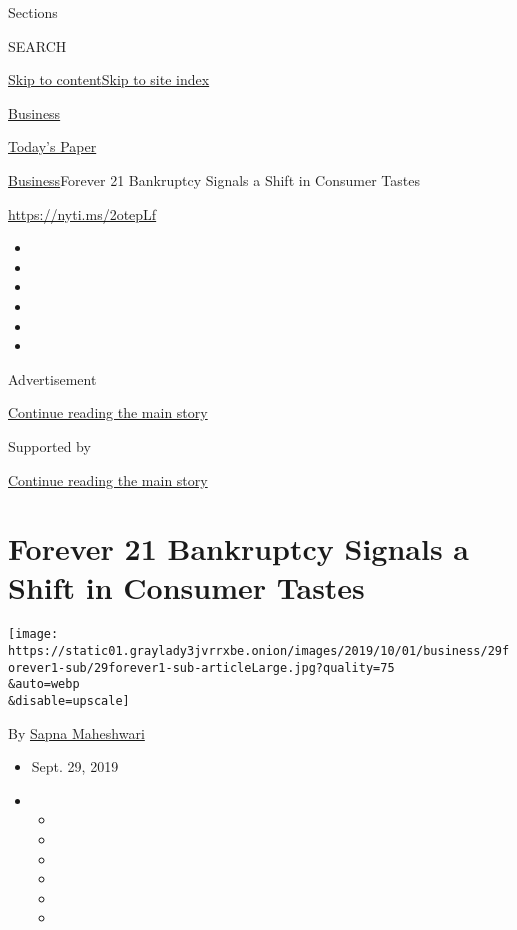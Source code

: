 Sections

SEARCH

\protect\hyperlink{site-content}{Skip to
content}\protect\hyperlink{site-index}{Skip to site index}

\href{https://www.nytimes3xbfgragh.onion/section/business}{Business}

\href{https://myaccount.nytimes3xbfgragh.onion/auth/login?response_type=cookie\&client_id=vi}{}

\href{https://www.nytimes3xbfgragh.onion/section/todayspaper}{Today's
Paper}

\href{/section/business}{Business}\textbar{}Forever 21 Bankruptcy
Signals a Shift in Consumer Tastes

\url{https://nyti.ms/2otepLf}

\begin{itemize}
\item
\item
\item
\item
\item
\item
\end{itemize}

Advertisement

\protect\hyperlink{after-top}{Continue reading the main story}

Supported by

\protect\hyperlink{after-sponsor}{Continue reading the main story}

\hypertarget{forever-21-bankruptcy-signals-a-shift-in-consumer-tastes}{%
\section{Forever 21 Bankruptcy Signals a Shift in Consumer
Tastes}\label{forever-21-bankruptcy-signals-a-shift-in-consumer-tastes}}

\texttt{[image: https://static01.graylady3jvrrxbe.onion/images/2019/10/01/business/29forever1-sub/29forever1-sub-articleLarge.jpg?quality=75\\\&auto=webp\\\&disable=upscale]}

By \href{https://www.nytimes3xbfgragh.onion/by/sapna-maheshwari}{Sapna
Maheshwari}

\begin{itemize}
\item
  Sept. 29, 2019
\item
  \begin{itemize}
  \item
  \item
  \item
  \item
  \item
  \item
  \end{itemize}
\end{itemize}

